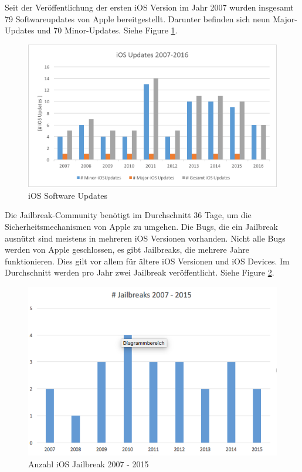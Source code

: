 Seit der Veröffentlichung der ersten iOS Version im Jahr 2007 wurden insgesamt 79 Softwareupdates von Apple bereitgestellt. Darunter befinden sich neun Major-Updates und 70  Minor-Updates. Siehe Figure \ref{fig:iOS Software Updates}.

\begin{figure}[!ht]
        \centering
                \includegraphics[scale=0.7]{Bilder/iOSUpdates1}
        \caption{iOS Software Updates\cite{Apple[7]}}
        	\label{fig:iOS Software Updates}
\end{figure}

Die Jailbreak-Community benötigt im Durchschnitt 36 Tage, um die Sicherheitsmechanismen von Apple zu umgehen. Die Bugs, die ein Jailbreak ausnützt sind meistens in mehreren iOS Versionen vorhanden. Nicht alle Bugs werden von Apple geschlossen, es gibt Jailbreaks, die mehrere Jahre funktionieren. Dies gilt vor allem für ältere iOS Versionen und iOS Devices. Im Durchschnitt werden pro Jahr zwei Jailbreak veröffentlicht. Siehe Figure \ref{fig:iOS Jailbreak}.

\begin{figure}[!ht]
        \centering
                \includegraphics[scale=0.7]{Bilder/AnzahlJB}
        \caption{Anzahl iOS Jailbreak 2007 - 2015}
        	\label{fig:iOS Jailbreak}
\end{figure}


